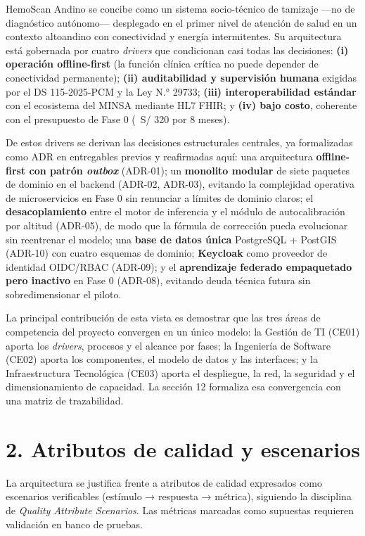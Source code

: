 \documentclass[11pt,a4paper]{article}
\begin{document}
HemoScan Andino se concibe como un sistema socio-t\'ecnico de tamizaje ---no de diagn\'ostico aut\'onomo--- desplegado en el primer nivel de atenci\'on de salud en un contexto altoandino con conectividad y energ\'ia intermitentes. Su arquitectura est\'a gobernada por cuatro \emph{drivers} que condicionan casi todas las decisiones: \textbf{(i) operaci\'on offline-first} (la funci\'on cl\'inica cr\'itica no puede depender de conectividad permanente); \textbf{(ii) auditabilidad y supervisi\'on humana} exigidas por el DS 115-2025-PCM y la Ley N.° 29733; \textbf{(iii) interoperabilidad est\'andar} con el ecosistema del MINSA mediante HL7 FHIR; y \textbf{(iv) bajo costo}, coherente con el presupuesto de Fase 0 (~S/ 320 por 8 meses).

De estos drivers se derivan las decisiones estructurales centrales, ya formalizadas como ADR en entregables previos y reafirmadas aqu\'i: una arquitectura \textbf{offline-first con patr\'on \emph{outbox}} (ADR-01); un \textbf{monolito modular} de siete paquetes de dominio en el backend (ADR-02, ADR-03), evitando la complejidad operativa de microservicios en Fase 0 sin renunciar a l\'imites de dominio claros; el \textbf{desacoplamiento} entre el motor de inferencia y el m\'odulo de autocalibraci\'on por altitud (ADR-05), de modo que la f\'ormula de correcci\'on pueda evolucionar sin reentrenar el modelo; una \textbf{base de datos \'unica} PostgreSQL + PostGIS (ADR-10) con cuatro esquemas de dominio; \textbf{Keycloak} como proveedor de identidad OIDC/RBAC (ADR-09); y el \textbf{aprendizaje federado empaquetado pero inactivo} en Fase 0 (ADR-08), evitando deuda t\'ecnica futura sin sobredimensionar el piloto.

La principal contribuci\'on de esta vista es demostrar que las tres \'areas de competencia del proyecto convergen en un \'unico modelo: la Gesti\'on de TI (CE01) aporta los \emph{drivers}, procesos y el alcance por fases; la Ingenier\'ia de Software (CE02) aporta los componentes, el modelo de datos y las interfaces; y la Infraestructura Tecnol\'ogica (CE03) aporta el despliegue, la red, la seguridad y el dimensionamiento de capacidad. La secci\'on 12 formaliza esa convergencia con una matriz de trazabilidad.

\section{2. Atributos de calidad y escenarios}\label{qas}

La arquitectura se justifica frente a atributos de calidad expresados como escenarios verificables (est\'imulo → respuesta → m\'etrica), siguiendo la disciplina de \emph{Quality Attribute Scenarios}. Las m\'etricas marcadas como supuestas requieren validaci\'on en banco de pruebas.
\end{document}
